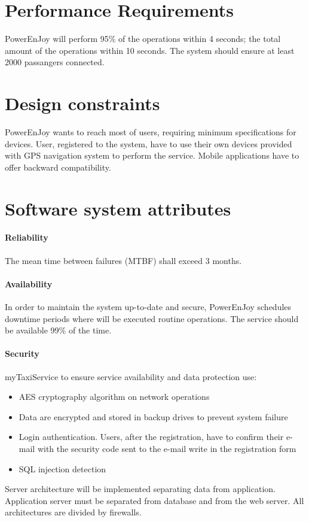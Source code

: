 \section{Performance Requirements}
PowerEnJoy will perform 95\% of the operations within 4 seconds; the total amount of the operations within 10 seconds.
The system should ensure at least 2000 passangers connected.

\section{Design constraints}
PowerEnJoy wants to reach most of users, requiring minimum specifications for devices.
User, registered to the system, have to use their own devices provided with GPS navigation system to perform the service. Mobile applications have to offer backward compatibility.

\section{Software system attributes}
\paragraph{Reliability}
The mean time between failures (MTBF) shall exceed 3 months.
\paragraph{Availability}
In order to maintain the system up-to-date and secure, PowerEnJoy schedules downtime periods where will be executed routine operations. The service should be available 99\% of the time.
\paragraph{Security}
myTaxiService to ensure service availability and data protection use:
\begin{itemize}
	\item AES cryptography algorithm on network operations
	\item Data are encrypted and stored in backup drives to prevent system failure
	\item Login authentication. Users, after the registration, have to confirm their e-mail with the security code sent to the e-mail write in the registration form
	\item SQL injection detection
\end{itemize}
Server architecture will be implemented separating
data from application. Application server must be separated
from database and from the web server. All architectures are divided by firewalls.
